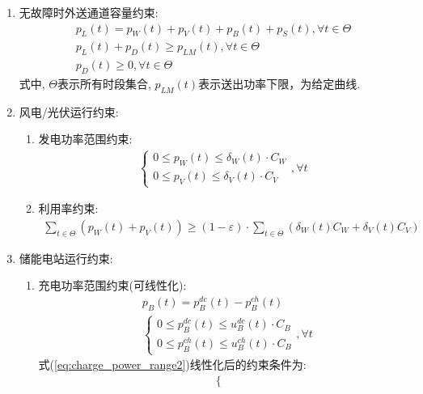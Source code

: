\documentclass{article}
\begin{document}
\begin{enumerate}
    \item {无故障时外送通道容量约束:
        \begin{gather}
            p_L(t)=p_W(t)+p_V(t)+p_B(t)+p_S(t),\forall t\in\Theta\\
            p_L(t)+p_D(t)\geq p_{LM}(t),\forall t\in\Theta\\
            p_D(t)\geq0,\forall t\in\Theta
        \end{gather}
        式中, $\Theta$表示所有时段集合, $p_{LM}(t)$表示送出功率下限，为给定曲线.
    }
    \item {风电/光伏运行约束:
        \begin{enumerate}
            \item {发电功率范围约束:
                \begin{align}
                    \begin{cases}0\leq p_W(t)\leq\delta_W(t)\cdot C_W\\0\leq p_V(t)\leq\delta_V(t)\cdot C_V\end{cases},\forall t
                \end{align}
            }
            \item {利用率约束:
                \begin{align}
                    \sum_{t\in\Theta}\left(p_W(t)+p_V(t)\right)\geq(1-\varepsilon)\cdot\sum_{t\in\Theta}\left(\delta_W(t)C_W+\delta_V(t)C_V\right)
                \end{align}
            }
        \end{enumerate}
    }
    \item {储能电站运行约束:
        \begin{enumerate}
            \item {充电功率范围约束({\color{red}可线性化}):
                \begin{align}
                    & p_{B}(t)=p_{B}^{dc}(t)-p_{B}^{ch}(t) \\
                    & \begin{cases}0\leq p_B^{dc}(t)\leq u_B^{dc}(t)\cdot C_B\\0\leq p_B^{ch}(t)\leq u_B^{ch}(t)\cdot C_B\end{cases},\forall t \label{eq:charge_power_range2} 
                \end{align}
                式(\ref{eq:charge_power_range2})线性化后的约束条件为:
                \begin{align}
                    \begin{cases}

\end{cases}
\end{align}}
\end{enumerate}}
\end{enumerate}
\end{document}
